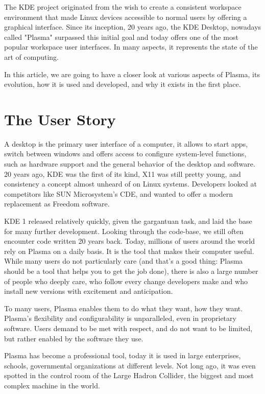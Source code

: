 

\noindent{}The KDE project originated from the wish to create a consistent workspace environment that made Linux devices accessible to normal users by offering a graphical interface.
Since its inception, 20 years ago, the KDE Desktop, nowadays called "Plasma" surpassed this initial goal and today offers one of the most popular workspace user interfaces. In many aspects, it represents the state of the art of computing.

In this article, we are going to have a closer look at various aspects of Plasma, its evolution, how it is used and developed, and why it exists in the first place.

\section*{The User Story}

A desktop is the primary user interface of a computer, it allows to start apps, switch between windows and offers access to configure system-level functions, such as hardware support and the general behavior of the desktop and software. 20 years ago, KDE was the first of its kind, X11 was still pretty young, and consistency a concept almost unheard of on Linux systems. Developers looked at competitors like SUN Microsystem's CDE, and wanted to offer a modern replacement as Freedom software.

KDE 1 released relatively quickly, given the gargantuan task, and laid the base for many further development. Looking through the code-base, we still often encounter code written 20 years back.
Today, millions of users around the world rely on Plasma on a daily basis. It is the tool that makes their computer useful. While many users do not particularly care (and that's a good thing: Plasma should be a tool that helps you to get the job done), there is also a large number of people who deeply care, who follow every change developers make and who install new versions with excitement and anticipation.

To many users, Plasma enables them to do what they want, how they want. Plasma's flexibility and configurability is unparalleled, even in proprietary software. Users demand to be met with respect, and do not want to be limited, but rather enabled by the software they use.

Plasma has become a professional tool, today it is used in large enterprises, schools, governmental organizations at different levels. Not long ago, it was even spotted in the control room of the Large Hadron Collider, the biggest and most complex machine in the world.

